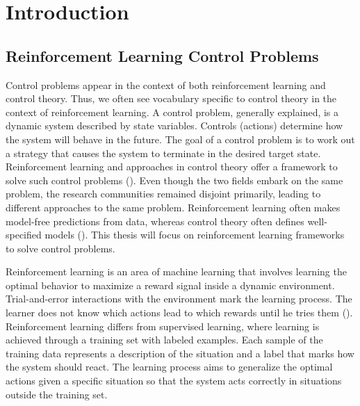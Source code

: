 
\chapter{Introduction}
\label{ch:introduction}


\section{Reinforcement Learning Control Problems}
Control problems appear in the context of both reinforcement learning and control theory. Thus, we often see vocabulary specific to control theory in the context of reinforcement learning. A control problem, generally explained, is a dynamic system described by state variables. Controls (actions) determine how the system will behave in the future. The goal of a control problem is to work out a strategy that causes the system to terminate in the desired target state. Reinforcement learning and approaches in control theory offer a framework to solve such control problems (\cite{bucsoniu2018reinforcement}). Even though the two fields embark on the same problem, the research communities remained disjoint primarily, leading to different approaches to the same problem. Reinforcement learning often makes model-free predictions from data, whereas control theory often defines well-specified models (\cite{recht2018tour}). This thesis will focus on reinforcement learning frameworks to solve control problems.

Reinforcement learning is an area of machine learning that involves learning the optimal behavior to maximize a reward signal inside a dynamic environment. Trial-and-error interactions with the environment mark the learning process. The learner does not know which actions lead to which rewards until he tries them (\cite{kaelbling1996reinforcement}). Reinforcement learning differs from supervised learning, where learning is achieved through a training set with labeled examples. Each sample of the training data represents a description of the situation and a label that marks how the system should react. The learning process aims to generalize the optimal actions given a specific situation so that the system acts correctly in situations outside the training set.

